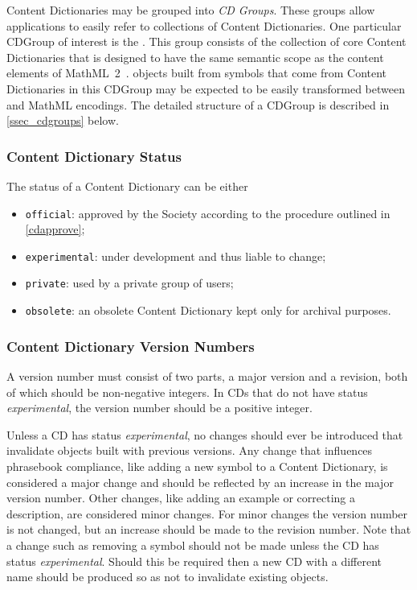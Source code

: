 Content Dictionaries may be grouped into \emph{CD Groups}. These groups
allow applications to easily refer to collections of Content Dictionaries. One particular
CDGroup of interest is the . This group consists of the
collection of core Content Dictionaries that is designed to have the same semantic scope
as the content elements of MathML~2~\cite{MathML_2003}.  \OM objects built from symbols
that come from Content Dictionaries in this CDGroup may be expected to be easily
transformed between \OM and MathML encodings.  The detailed structure of a CDGroup is
described in \ref{ssec_cdgroups} below.
    
\subsubsection{Content Dictionary Status}\label{sec_status}

The status of a Content Dictionary can be either
\begin{itemize}
\item \lstinline|official|: approved by the \OM Society according to the procedure
  outlined in \ref{cdapprove};
\item \lstinline|experimental|: under development and thus liable to change;
\item \lstinline|private|: used by a private group of \OM users;
\item \lstinline|obsolete|: an obsolete Content Dictionary kept only for archival
  purposes.
\end{itemize}
 
\subsubsection{Content Dictionary Version Numbers}\label{sec_version}
      
A version number must consist of two parts, a major version and a revision, both of which
should be non-negative integers.  In CDs that do not have status \emph{experimental}, the
version number should be a positive integer.
      
Unless a CD has status \emph{experimental}, no changes should ever be introduced that
invalidate objects built with previous versions.  Any change that influences phrasebook
compliance, like adding a new symbol to a Content Dictionary, is considered a major change
and should be reflected by an increase in the major version number. Other changes, like
adding an example or correcting a description, are considered minor changes. For minor
changes the version number is not changed, but an increase should be made to the revision
number.  Note that a change such as removing a symbol should not be made unless the CD has
status \emph{experimental}.  Should this be required then a new CD with a different name
should be produced so as not to invalidate existing objects.
      
